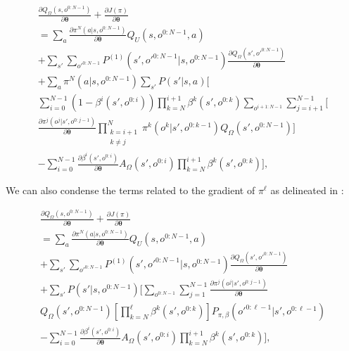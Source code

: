 \documentclass[letterpaper]{article} %
\begin{document}
\begin{equation} 
\begin{split}
\frac{\partial Q_\Omega(s,o^{0:N-1})}{\partial \bm{\theta}} + \frac{\partial J(\pi)}{\partial \bm{\theta}}\\
= \sum_{a} \frac{ \partial \pi^N(a|s,o^{0:N-1})}{\partial \bm{\theta}} Q_U(s,o^{0:N-1},a) \\
+  \sum_{s'} \sum_{o'^{0:N-1}} P^{(1)}(s',o'^{0:N-1}|s,o^{0:N-1}) \frac{\partial Q_\Omega(s',o'^{0:N-1})}{\partial \bm{\theta}} \\
+ \sum_{a} \pi^N(a|s,o^{0:N-1})  \sum_{s'} P (s'|s,a) \bigg[ \\
\sum_{i=0}^{N - 1}(1-\beta^i(s',o^{0:i})) \prod_{k=N}^{i+1} \beta^k(s',o^{0:k}) \sum_{o^{i+1:N-1}}  \sum_{j=i+1}^{N-1} \bigg[\\ \frac{ \partial \pi^j(o^j|s',o^{0:j-1})}{\partial \bm{\theta}} \prod_{\substack{k=i+1 \\ k \neq j}}^{N} \pi^k(o^k|s',o^{0:k-1}) Q_\Omega(s',o^{0:N-1}) \bigg]\\
- \sum_{i=0}^{N - 1}\frac{ \partial \beta^i(s',o^{0:i})}{\partial \bm{\theta}} A_\Omega(s',o^{0:i}) \prod_{k=N}^{i+1} \beta^k(s',o^{0:k}) \bigg],
\end{split}
\end{equation}

We can also condense the terms related to the gradient of $\pi^\ell$ as delineated in \cite{weightsharingAAAI}:

\begin{equation} 
\begin{split}
\frac{\partial Q_\Omega(s,o^{0:N-1})}{\partial \bm{\theta}} + \frac{\partial J(\pi)}{\partial \bm{\theta}}\\
= \sum_{a} \frac{ \partial \pi^N(a|s,o^{0:N-1})}{\partial \bm{\theta}} Q_U(s,o^{0:N-1},a) \\
+  \sum_{s'} \sum_{o'^{0:N-1}} P^{(1)}(s',o'^{0:N-1}|s,o^{0:N-1}) \frac{\partial Q_\Omega(s',o'^{0:N-1})}{\partial \bm{\theta}} \\
+ \sum_{s'} P(s'|s,o^{0:N-1}) \bigg[
\sum_{o^{0:N-1}}  \sum_{j=1}^{N-1}  \frac{ \partial \pi^j(o^j|s',o^{0:j-1})}{\partial \bm{\theta}}\\ Q_\Omega(s',o^{0:N-1}) [\prod_{k=N}^{\ell} \beta^k(s',o^{0:k})] P_{\pi,\beta}(o'^{0:\ell-1}|s',o^{0:\ell-1})\\
- \sum_{i=0}^{N - 1}\frac{ \partial \beta^i(s',o^{0:i})}{\partial \bm{\theta}} A_\Omega(s',o^{0:i}) \prod_{k=N}^{i+1} \beta^k(s',o^{0:k}) \bigg],
\end{split}
\end{equation}
\end{document}
